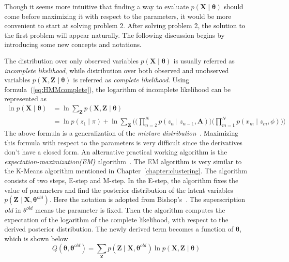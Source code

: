 Though it seems more intuitive that finding a way to evaluate \(p(\mathbf{X} \mid \boldsymbol{\theta})\) should come before maximizing it with respect to the parameters, it would be more convenient to start at solving problem 2. After solving problem 2, the solution to the first problem will appear naturally. The following discussion begins by introducing some new concepts and notations.

The distribution over only observed variables \(p(\mathbf{X} \mid \boldsymbol{\theta})\) is usually referred as \textit{incomplete likelihood}, while distribution over both observed and unobserved variables \(p(\mathbf{X}, \mathbf{Z} \mid \boldsymbol{\theta})\) is referred as \textit{complete likelihood}. Using formula~(\ref{eq:HMMcomplete}), the logarithm of incomplete likelihood can be represented as
\begin{equation}
	\begin{split}
		\ln p(\mathbf{X} \mid \boldsymbol{\theta}) & = \ln \sum_{\mathbf{Z}}p(\mathbf{X}, \mathbf{Z} \mid \boldsymbol{\theta}) \\
										   & = \ln p(z_1 \mid \pi)  + \ln \sum_{\mathbf{Z}}\Big( \big(\prod_{n=2}^{N}p(z_n\mid z_{n-1}, \mathbf{A})\big) \big(\prod_{m=1}^{N}p(x_m\mid z_m, \phi)\big)\Big)
	\end{split}
\end{equation}
The above formula is a generalization of the \textit{mixture distribution}~\cite{PRML}. Maximizing this formula with respect to the parameters is very difficult since the derivatives don't have a closed form. An alternative practical working algorithm is the \textit{expectation-maximization(EM)} algorithm~\cite{dempster1977maximum}\cite{mclachlan2007algorithm}. The EM algorithm is very similar to the K-Means algorithm mentioned in Chapter~\ref{chapter:clustering}. The algorithm consists of two steps, E-step and M-step. In the E-step, the algorithm fixes the value of parameters and find the posterior distribution of the latent variables \(p(\mathbf{Z} \mid \mathbf{X}, \boldsymbol{\theta}^{old})\). Here the notation is adopted from Bishop's~\cite{PRML}. The superscription \textit{old} in \(\theta^{old}\) means the parameter is fixed. Then the algorithm computes the expectation of the logarithm of the complete likelihood, with respect to the derived posterior distribution. The newly derived term becomes a function of \(\boldsymbol{\theta}\), which is shown below
\begin{equation}
	Q(\boldsymbol{\theta}, \boldsymbol{\theta}^{old}) = \sum_{\mathbf{Z}}p(\mathbf{Z}\mid \mathbf{X}, \boldsymbol{\theta}^{old})\ln p(\mathbf{X}, \mathbf{Z} \mid \boldsymbol{\theta})
\end{equation}
